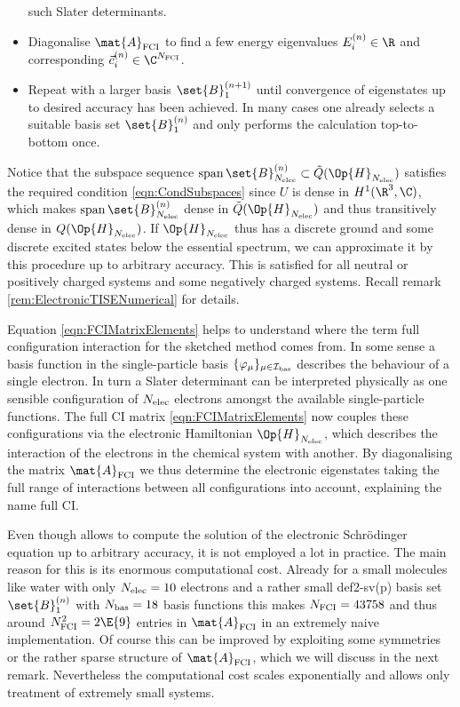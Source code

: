 \begin{rem}[Full CI]
\begin{itemize}
		such Slater determinants.
	\item Diagonalise $\mat{A}_\text{FCI}$ to find a few energy eigenvalues
		$E_i^{(n)} \in \R$ and corresponding 
		$\vec{c}^{(n)}_i \in \C^{\Nfci}$.
	\item Repeat with a larger basis $\set{B}_1^{(n+1)}$ until convergence
		of eigenstates up to desired accuracy has been achieved.
		In many cases one already selects a suitable basis set
		$\set{B}_1^{(n)}$ and only performs the calculation top-to-bottom once.
	\end{itemize}
	Notice that the subspace sequence
	$\spacespan \set{B}_{\Nelec}^{(n)} \subset \tilde{Q}(\Op{H}_{\Nelec})$
	satisfies the required condition \eqref{eqn:CondSubspaces}
	since $U$ is dense in $H^1(\R^3, \C)$,
	which makes $\spacespan \set{B}_{\Nelec}^{(n)}$
	dense in $\tilde{Q}(\Op{H}_{\Nelec})$
	and thus transitively dense in $Q(\Op{H}_{\Nelec})$.
	If $\Op{H}_{\Nelec}$ thus has a discrete ground and some discrete
	excited states below the essential spectrum,
	we can approximate it by this procedure up to arbitrary accuracy.
	This is satisfied for all neutral or positively charged systems
	and some negatively charged systems.
	Recall remark \vref{rem:ElectronicTISENumerical} for details.
\end{rem}
Equation \eqref{eqn:FCIMatrixElements} helps to understand
where the term full configuration interaction for the sketched
method comes from.
In some sense a basis function in the single-particle
basis $\{\varphi_\mu\}_{\mu\in\mathcal{I}_\text{bas}}$
describes the behaviour of a single electron.
In turn a Slater determinant can be interpreted physically
as one sensible configuration of $N_\text{elec}$ electrons
amongst the available single-particle functions.
The full CI matrix \eqref{eqn:FCIMatrixElements}
now couples these configurations
via the electronic Hamiltonian $\Op{H}_{\Nelec}$,
which describes the interaction of the electrons in the chemical
system with another.
By diagonalising the matrix $\mat{A}_\text{FCI}$ we thus determine
the electronic eigenstates taking the full range of interactions between
all configurations into account, explaining the name full CI.

Even though \FCI allows to compute the solution of the electronic
Schrödinger equation up to arbitrary accuracy,
it is not employed a lot in practice.
The main reason for this is its enormous computational cost.
Already for a small molecules like water with only
$N_\text{elec} = 10$ electrons and a rather small def2-sv(p) basis set
$\set{B}_1^{(n)}$ with $N_\text{bas} = 18$ basis functions this makes $N_\text{FCI} = 43758$
and thus around $\Nfci^2 = 2\E{9}$ entries in $\mat{A}_\text{FCI}$
in an extremely naive implementation.
Of course this can be improved by exploiting some symmetries
or the rather sparse structure of $\mat{A}_\text{FCI}$,
which we will discuss in the next remark.
Nevertheless the computational cost scales exponentially
and allows only treatment of extremely small systems.

